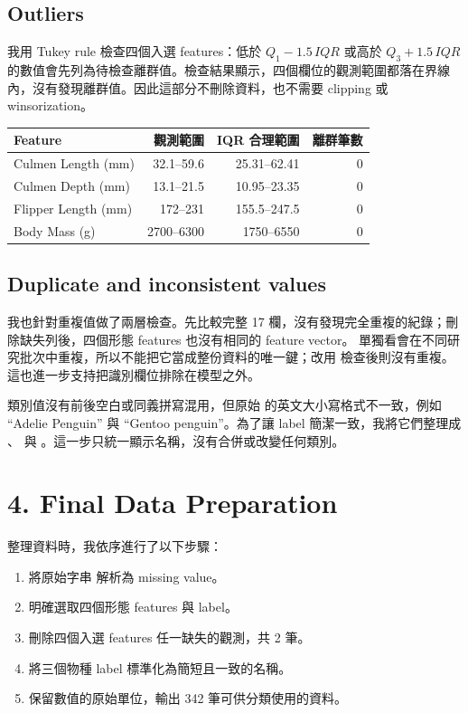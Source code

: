 \subsection*{Outliers}

我用 Tukey rule 檢查四個入選 features：低於 $Q_1-1.5\,IQR$ 或高於 $Q_3+1.5\,IQR$ 的數值會先列為待檢查離群值。檢查結果顯示，四個欄位的觀測範圍都落在界線內，沒有發現離群值。因此這部分不刪除資料，也不需要 clipping 或 winsorization。

\begin{table}[H]
\centering
\small
\begin{tabular}{lrrr}
\toprule
\textbf{Feature} & \textbf{觀測範圍} & \textbf{IQR 合理範圍} & \textbf{離群筆數} \\
\midrule
Culmen Length (mm) & 32.1--59.6 & 25.31--62.41 & 0 \\
Culmen Depth (mm) & 13.1--21.5 & 10.95--23.35 & 0 \\
Flipper Length (mm) & 172--231 & 155.5--247.5 & 0 \\
Body Mass (g) & 2700--6300 & 1750--6550 & 0 \\
\bottomrule
\end{tabular}
\end{table}

\subsection*{Duplicate and inconsistent values}

我也針對重複值做了兩層檢查。先比較完整 17 欄，沒有發現完全重複的紀錄；刪除缺失列後，四個形態 features 也沒有相同的 feature vector。 單獨看會在不同研究批次中重複，所以不能把它當成整份資料的唯一鍵；改用  檢查後則沒有重複。這也進一步支持把識別欄位排除在模型之外。

類別值沒有前後空白或同義拼寫混用，但原始  的英文大小寫格式不一致，例如 ``Adelie Penguin'' 與 ``Gentoo penguin''。為了讓 label 簡潔一致，我將它們整理成 、 與 。這一步只統一顯示名稱，沒有合併或改變任何類別。

\section*{4. Final Data Preparation}
\sectionrule

整理資料時，我依序進行了以下步驟：

\begin{enumerate}[leftmargin=1.7em,itemsep=0.35em]
  \item 將原始字串  解析為 missing value。
  \item 明確選取四個形態 features 與  label。
  \item 刪除四個入選 features 任一缺失的觀測，共 2 筆。
  \item 將三個物種 label 標準化為簡短且一致的名稱。
  \item 保留數值的原始單位，輸出 342 筆可供分類使用的資料。
\end{enumerate}

